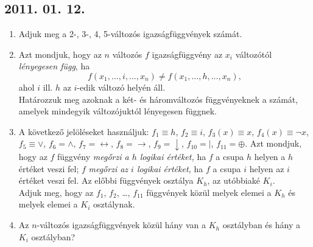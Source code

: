 \documentclass{article}
\begin{document}
\subsection*{2011. 01. 12.}
\begin{enumerate}
\item Adjuk meg a 2-, 3-, 4, 5-változós igazságfüggvények számát.
\item Azt mondjuk, hogy az $n$ változós $f$ igazságfüggvény az $x_i$ változótól \emph{lényegesen függ}, ha
\[f(x_1,\ldots,i,\ldots,x_n)\ne f(x_1,\ldots,h,\ldots,x_n),\]
ahol $i$ ill. $h$ az $i$-edik változó helyén áll.\\
Határozzuk meg azoknak a két- és háromváltozós függvényeknek a számát, amelyek mindegyik változójuktól lényegesen függnek.
\item A következő jelöléseket használjuk: $f_1\equiv h$, $f_2\equiv i$, $f_3(x)\equiv x$, $f_4(x)\equiv \neg x$, $f_5\equiv \lor$, $f_6=\land$, $f_7=\leftrightarrow$, $f_8=\to$, $f_9=\downarrow$, $f_{10}=|$, $f_{11}=\oplus$. Azt mondjuk, hogy az $f$ függvény \emph{megőrzi a $h$ logikai értéket,} ha $f$ a csupa $h$ helyen a $h$ értéket veszi fel; $f$ \emph{megőrzi az $i$ logikai értéket,} ha $f$ a csupa $i$ helyen az $i$ értéket veszi fel. Az előbbi függvények osztálya $K_h$, az utóbbiaké $K_i$.\\
Adjuk meg, hogy az $f_1$, $f_2$, \ldots, $f_{11}$ függvények közül melyek elemei a $K_h$ és melyek elemei a $K_i$ osztálynak.
\item Az $n$-változós igazságfüggvények közül hány van a $K_h$ osztályban és hány a $K_i$ osztályban?
\end{enumerate}
\end{document}
